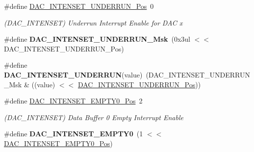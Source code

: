 \begin{DoxyCompactItemize}
\item 
\hypertarget{group___s_a_m_l21___d_a_c_ga38aa2d8302976875d983b1e2c6b0ced2}{}\#define \hyperlink{group___s_a_m_l21___d_a_c_ga38aa2d8302976875d983b1e2c6b0ced2}{D\+A\+C\+\_\+\+I\+N\+T\+E\+N\+S\+E\+T\+\_\+\+U\+N\+D\+E\+R\+R\+U\+N\+\_\+\+Pos}~0\label{group___s_a_m_l21___d_a_c_ga38aa2d8302976875d983b1e2c6b0ced2}

\begin{DoxyCompactList}\small\item\em (D\+A\+C\+\_\+\+I\+N\+T\+E\+N\+S\+E\+T) Underrun Interrupt Enable for D\+A\+C x \end{DoxyCompactList}\item 
\hypertarget{group___s_a_m_l21___d_a_c_gaee8eacc62123398f6f2165cfac7e4d0e}{}\#define {\bfseries D\+A\+C\+\_\+\+I\+N\+T\+E\+N\+S\+E\+T\+\_\+\+U\+N\+D\+E\+R\+R\+U\+N\+\_\+\+Msk}~(0x3ul $<$$<$ D\+A\+C\+\_\+\+I\+N\+T\+E\+N\+S\+E\+T\+\_\+\+U\+N\+D\+E\+R\+R\+U\+N\+\_\+\+Pos)\label{group___s_a_m_l21___d_a_c_gaee8eacc62123398f6f2165cfac7e4d0e}

\item 
\hypertarget{group___s_a_m_l21___d_a_c_ga0640098b3740387e3ef1d186d9c201f1}{}\#define {\bfseries D\+A\+C\+\_\+\+I\+N\+T\+E\+N\+S\+E\+T\+\_\+\+U\+N\+D\+E\+R\+R\+U\+N}(value)~(D\+A\+C\+\_\+\+I\+N\+T\+E\+N\+S\+E\+T\+\_\+\+U\+N\+D\+E\+R\+R\+U\+N\+\_\+\+Msk \& ((value) $<$$<$ \hyperlink{group___s_a_m_l21___d_a_c_ga38aa2d8302976875d983b1e2c6b0ced2}{D\+A\+C\+\_\+\+I\+N\+T\+E\+N\+S\+E\+T\+\_\+\+U\+N\+D\+E\+R\+R\+U\+N\+\_\+\+Pos}))\label{group___s_a_m_l21___d_a_c_ga0640098b3740387e3ef1d186d9c201f1}

\item 
\hypertarget{group___s_a_m_l21___d_a_c_ga71699d638d22b68c3ae3d4d4bd85d3bd}{}\#define \hyperlink{group___s_a_m_l21___d_a_c_ga71699d638d22b68c3ae3d4d4bd85d3bd}{D\+A\+C\+\_\+\+I\+N\+T\+E\+N\+S\+E\+T\+\_\+\+E\+M\+P\+T\+Y0\+\_\+\+Pos}~2\label{group___s_a_m_l21___d_a_c_ga71699d638d22b68c3ae3d4d4bd85d3bd}

\begin{DoxyCompactList}\small\item\em (D\+A\+C\+\_\+\+I\+N\+T\+E\+N\+S\+E\+T) Data Buffer 0 Empty Interrupt Enable \end{DoxyCompactList}\item 
\hypertarget{group___s_a_m_l21___d_a_c_ga9e329b92d3ec11f8a944ebb87de1b6d0}{}\#define {\bfseries D\+A\+C\+\_\+\+I\+N\+T\+E\+N\+S\+E\+T\+\_\+\+E\+M\+P\+T\+Y0}~(1 $<$$<$ \hyperlink{group___s_a_m_l21___d_a_c_ga71699d638d22b68c3ae3d4d4bd85d3bd}{D\+A\+C\+\_\+\+I\+N\+T\+E\+N\+S\+E\+T\+\_\+\+E\+M\+P\+T\+Y0\+\_\+\+Pos})\label{group___s_a_m_l21___d_a_c_ga9e329b92d3ec11f8a944ebb87de1b6d0}


\end{DoxyCompactItemize}
